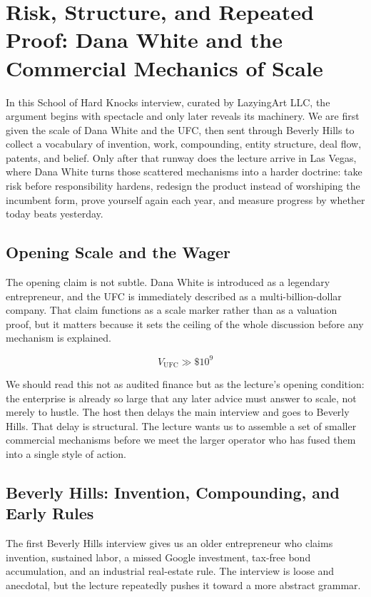 \chapter{Risk, Structure, and Repeated Proof: Dana White and the Commercial Mechanics of Scale}

In this School of Hard Knocks interview, curated by LazyingArt LLC, the argument begins with spectacle and only later reveals its machinery. We are first given the scale of Dana White and the UFC, then sent through Beverly Hills to collect a vocabulary of invention, work, compounding, entity structure, deal flow, patents, and belief. Only after that runway does the lecture arrive in Las Vegas, where Dana White turns those scattered mechanisms into a harder doctrine: take risk before responsibility hardens, redesign the product instead of worshiping the incumbent form, prove yourself again each year, and measure progress by whether today beats yesterday.

\section{Opening Scale and the Wager}

The opening claim is not subtle. Dana White is introduced as a legendary entrepreneur, and the UFC is immediately described as a multi-billion-dollar company. That claim functions as a scale marker rather than as a valuation proof, but it matters because it sets the ceiling of the whole discussion before any mechanism is explained.

\begin{equation}
V_{\mathrm{UFC}} \gg \$10^9
\end{equation}

We should read this not as audited finance but as the lecture's opening condition: the enterprise is already so large that any later advice must answer to scale, not merely to hustle. The host then delays the main interview and goes to Beverly Hills. That delay is structural. The lecture wants us to assemble a set of smaller commercial mechanisms before we meet the larger operator who has fused them into a single style of action.

\section{Beverly Hills: Invention, Compounding, and Early Rules}

The first Beverly Hills interview gives us an older entrepreneur who claims invention, sustained labor, a missed Google investment, tax-free bond accumulation, and an industrial real-estate rule. The interview is loose and anecdotal, but the lecture repeatedly pushes it toward a more abstract grammar.

